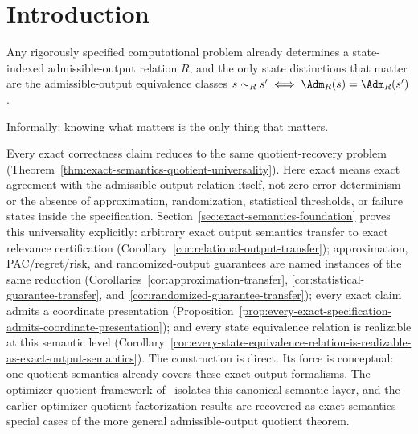 \section{Introduction}

Any rigorously specified computational problem already determines a state-indexed admissible-output relation $R$, and the only state distinctions that matter are the admissible-output equivalence classes $s \sim_R s' \iff \Adm_R(s)=\Adm_R(s')$.

\par\medskip
\noindent
Informally: knowing what matters is the only thing that matters.
\par\medskip

Every exact correctness claim reduces to the same quotient-recovery problem (Theorem~\ref{thm:exact-semantics-quotient-universality}). Here exact means exact agreement with the admissible-output relation itself, not zero-error determinism or the absence of approximation, randomization, statistical thresholds, or failure states inside the specification. Section~\ref{sec:exact-semantics-foundation} proves this universality explicitly: arbitrary exact output semantics transfer to exact relevance certification (Corollary~\ref{cor:relational-output-transfer}); approximation, PAC/regret/risk, and randomized-output guarantees are named instances of the same reduction (Corollaries~\ref{cor:approximation-transfer}, \ref{cor:statistical-guarantee-transfer}, and~\ref{cor:randomized-guarantee-transfer}); every exact claim admits a coordinate presentation (Proposition~\ref{prop:every-exact-specification-admits-coordinate-presentation}); and every state equivalence relation is realizable at this semantic level (Corollary~\ref{cor:every-state-equivalence-relation-is-realizable-as-exact-output-semantics}). The construction is direct. Its force is conceptual: one quotient semantics already covers these exact output formalisms. The optimizer-quotient framework of~\cite{simas2026optimizerquotient} isolates this canonical semantic layer, and the earlier optimizer-quotient factorization results are recovered as exact-semantics special cases of the more general admissible-output quotient theorem.

